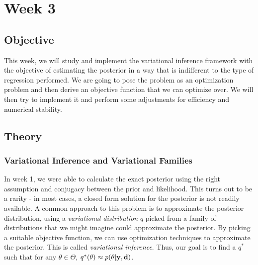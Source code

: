 \section{Week 3}
\subsection{Objective}
This week, we will study and implement the variational inference framework with the objective of
estimating the posterior in a way that is indifferent to the type of regression performed.
We are going to pose the problem as an optimization problem and then derive an objective function that we can optimize over.
We will then try to implement it and perform some adjustments for efficiency and numerical stability.
\subsection{Theory}
\subsubsection{Variational Inference and Variational Families}
In week 1, we were able to calculate the exact posterior using the right assumption and conjugacy between the prior and likelihood.
This turns out to be a rarity - in most cases, a closed form solution for the posterior is not readily available.
A common approach to this problem is to approximate the posterior distribution, using a \textit{variational distribution} $q$ picked from a family of distributions 
that we might imagine could approximate the posterior.
By picking a suitable objective function, we can use optimization techniques to approximate the posterior.
This is called \textit{variational inference}. Thus, our goal is to find a $q^*$ such that for any $\theta\in \Theta$, $q^*(\theta) \approx p(\theta | \mathbf{y}, \mathbf{d})$.
